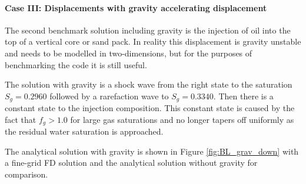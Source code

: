 \paragraph{Case III: Displacements with gravity accelerating displacement}

The second benchmark solution including gravity is the injection of oil into the top of a vertical core or sand pack. In reality this displacement is gravity unstable and needs to be modelled in two-dimensions, but for the purposes of benchmarking the code it is still useful. 

The solution with gravity is a shock wave from the right state to the saturation $S_g = 0.2960$ followed by a rarefaction wave to $S_g = 0.3340$.  Then there is a constant state to the injection composition.  This constant state is caused by the fact that $f_g > 1.0$ for large gas saturations and no longer tapers off uniformly as the residual water saturation is approached.

The analytical solution with gravity is shown in Figure \ref{fig:BL_grav_down} with a fine-grid FD solution and the analytical solution without gravity for comparison.  


